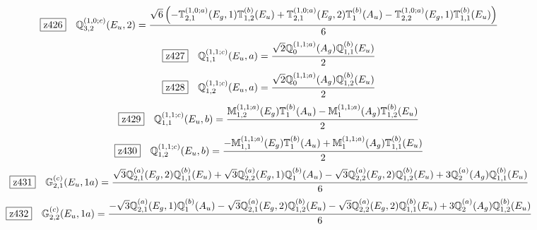 \documentclass[fleqn,10pt,landscape]{jsarticle}
\begin{document}
\begin{dmath*}
\hspace*{3mm}\fbox{z426}\quad \mathbb{Q}_{3,2}^{(1,0;c)}(E_{u},2)=\frac{\sqrt{6} \left(- \mathbb{T}_{2,1}^{(1,0;a)}(E_{g},1) \mathbb{T}_{1,2}^{(b)}(E_{u}) + \mathbb{T}_{2,1}^{(1,0;a)}(E_{g},2) \mathbb{T}_{1}^{(b)}(A_{u}) - \mathbb{T}_{2,2}^{(1,0;a)}(E_{g},1) \mathbb{T}_{1,1}^{(b)}(E_{u})\right)}{6}
\end{dmath*}
\begin{dmath*}
\hspace*{3mm}\fbox{z427}\quad \mathbb{Q}_{1,1}^{(1,1;c)}(E_{u},a)=\frac{\sqrt{2} \mathbb{Q}_{0}^{(1,1;a)}(A_{g}) \mathbb{Q}_{1,1}^{(b)}(E_{u})}{2}
\end{dmath*}
\begin{dmath*}
\hspace*{3mm}\fbox{z428}\quad \mathbb{Q}_{1,2}^{(1,1;c)}(E_{u},a)=\frac{\sqrt{2} \mathbb{Q}_{0}^{(1,1;a)}(A_{g}) \mathbb{Q}_{1,2}^{(b)}(E_{u})}{2}
\end{dmath*}
\begin{dmath*}
\hspace*{3mm}\fbox{z429}\quad \mathbb{Q}_{1,1}^{(1,1;c)}(E_{u},b)=\frac{\mathbb{M}_{1,2}^{(1,1;a)}(E_{g}) \mathbb{T}_{1}^{(b)}(A_{u}) - \mathbb{M}_{1}^{(1,1;a)}(A_{g}) \mathbb{T}_{1,2}^{(b)}(E_{u})}{2}
\end{dmath*}
\begin{dmath*}
\hspace*{3mm}\fbox{z430}\quad \mathbb{Q}_{1,2}^{(1,1;c)}(E_{u},b)=\frac{- \mathbb{M}_{1,1}^{(1,1;a)}(E_{g}) \mathbb{T}_{1}^{(b)}(A_{u}) + \mathbb{M}_{1}^{(1,1;a)}(A_{g}) \mathbb{T}_{1,1}^{(b)}(E_{u})}{2}
\end{dmath*}
\begin{dmath*}
\hspace*{3mm}\fbox{z431}\quad \mathbb{G}_{2,1}^{(c)}(E_{u},1a)=\frac{\sqrt{3} \mathbb{Q}_{2,1}^{(a)}(E_{g},2) \mathbb{Q}_{1,1}^{(b)}(E_{u}) + \sqrt{3} \mathbb{Q}_{2,2}^{(a)}(E_{g},1) \mathbb{Q}_{1}^{(b)}(A_{u}) - \sqrt{3} \mathbb{Q}_{2,2}^{(a)}(E_{g},2) \mathbb{Q}_{1,2}^{(b)}(E_{u}) + 3 \mathbb{Q}_{2}^{(a)}(A_{g}) \mathbb{Q}_{1,1}^{(b)}(E_{u})}{6}
\end{dmath*}
\begin{dmath*}
\hspace*{3mm}\fbox{z432}\quad \mathbb{G}_{2,2}^{(c)}(E_{u},1a)=\frac{- \sqrt{3} \mathbb{Q}_{2,1}^{(a)}(E_{g},1) \mathbb{Q}_{1}^{(b)}(A_{u}) - \sqrt{3} \mathbb{Q}_{2,1}^{(a)}(E_{g},2) \mathbb{Q}_{1,2}^{(b)}(E_{u}) - \sqrt{3} \mathbb{Q}_{2,2}^{(a)}(E_{g},2) \mathbb{Q}_{1,1}^{(b)}(E_{u}) + 3 \mathbb{Q}_{2}^{(a)}(A_{g}) \mathbb{Q}_{1,2}^{(b)}(E_{u})}{6}
\end{dmath*}
\end{document}
